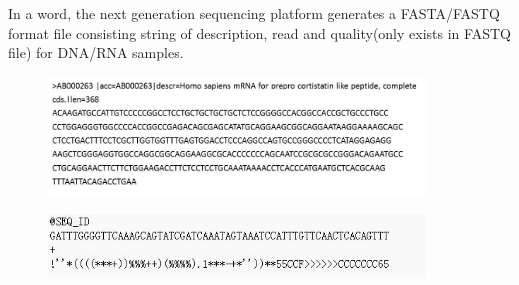 \documentclass{article}
\begin{document}
In a word, the next generation sequencing platform generates a FASTA/FASTQ format file consisting string of description, read and quality(only exists in FASTQ file) for DNA/RNA samples.
\begin{figure}[ht]
  \centering
  \includegraphics[width=10cm]{Figure2.jpg}\\
  \caption{}\label{fasta_format}
\end{figure}
\begin{figure}[ht]
  \centering
  \includegraphics[width=10cm]{Figure3.jpg}\\
  \caption{}\label{fastq_format}
\end{figure}
\end{document}
